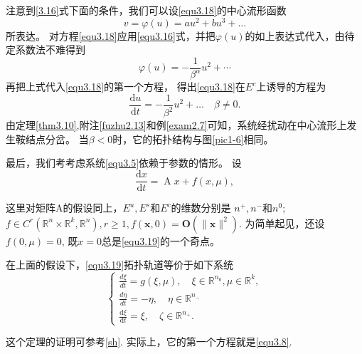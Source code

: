 \begin{example}
	注意到\ref{3.16}式下面的条件，我们可以设\ref{equ3.18}的中心流形函数
	\[
		v = \varphi ( u ) = a u ^ { 2 } + b u ^ { 3 } + \dots
	\]
	所表达。
	对方程\ref{equ3.18}应用\ref{equ3.16}式，并把$\varphi ( u )$的如上表达式代入，由待定系数法不难得到
	\[
		\varphi (u ) = - \frac { 1 } { \beta ^ { \alpha } } u ^ { 2 } + \cdots
	\]
	再把上式代入\ref{equ3.18}的第一个方程，
	得出\ref{equ3.18}在\(E^c\)上诱导的方程为
	\[
		\frac { \mathrm { d } u } { \mathrm { d } t } = - \frac { 1 } { \beta ^ { 2 } } u ^ { 2 } + \dots
		\quad
		\beta \neq 0.
	\]
	由定理\ref{thm3.10},附注\ref{fuzhu2.13}和例\ref{exam2.7}可知，系统经扰动在中心流形上发生鞍结点分岔。
	当\(\beta<0\)时，它的拓扑结构与图\ref{pic1-6}相同。
\end{example}

最后，我们考考虑系统\ref{equ3.5}依赖于参数的情形。
设
\begin{equation}
	\frac { \mathrm { d } x } { \mathrm { d } t } = \operatorname{A} x + f ( x , \mu ),
	\label{eq:1.3.19}
\end{equation}

这里对矩阵A的假设同上，\(E^u,E^s\)和\(E^c\)的维数分别是
\(n^+,n^-\)和\(n^0\);
$f \in C ^ { r } \left( \mathbb{ R } ^ { n } \times \mathbb { R } ^ { k } , \mathbb{ R } ^ { n } \right) , r \geqslant 1 , f (\boldsymbol{ x} , 0 ) = \boldsymbol { O } \left( \| \boldsymbol{ x} \| ^ { 2 } \right)$.
为简单起见，还设\(f(0,\mu)=0\),
既\(x=0\)总是\ref{equ3.19}的一个奇点。

\begin{theorem}
	在上面的假设下，\ref{equ3.19}拓扑轨道等价于如下系统
	\begin{equation}
		\left\{
		\begin{array}{l}
			\frac { d \xi } { d t } = g ( \xi , \mu ) ,
			\quad
			\xi \in \mathbb { R } ^ { n _ { 0 } } , \mu \in \mathbb { R } ^ { k }, \\
			\frac { d \eta } { d t } = - \eta ,
			\quad
			\eta \in\mathbb{ R} ^ { n _-}                                          \\
			\frac { \mathrm { d } \xi } { \mathrm { d } t } = \xi ,
			\quad
			\zeta \in \mathbb{ R } ^ { n_+ } .
		\end{array}
		\right.
		\label{eq:1.3.20}
	\end{equation}
\end{theorem}


这个定理的证明可参考\ref{sh}.
实际上，它的第一个方程就是\ref{equ3.8}.

